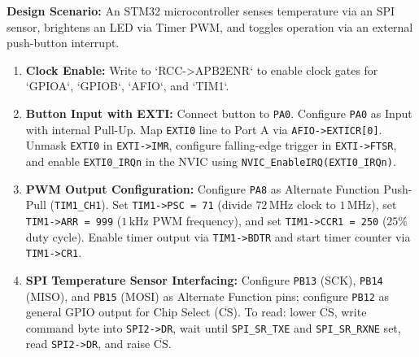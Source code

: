 \documentclass[12pt,a4paper]{article}
\begin{document}
\begin{tcolorbox}[examplebox, title={Worked Interface Design: ARM Push-Button, PWM LED and SPI Sensor}]
\textbf{Design Scenario:} An STM32 microcontroller senses temperature via an SPI sensor, brightens an LED via Timer PWM, and toggles operation via an external push-button interrupt.
\par\vspace{4pt}
\begin{enumerate}[leftmargin=*]
  \item \textbf{Clock Enable:} Write to `RCC->APB2ENR` to enable clock gates for `GPIOA`, `GPIOB`, `AFIO`, and `TIM1`.
  \item \textbf{Button Input with EXTI:} Connect button to \texttt{PA0}. Configure \texttt{PA0} as Input with internal Pull-Up. Map \texttt{EXTI0} line to Port A via \texttt{AFIO->EXTICR[0]}. Unmask \texttt{EXTI0} in \texttt{EXTI->IMR}, configure falling-edge trigger in \texttt{EXTI->FTSR}, and enable \texttt{EXTI0\_IRQn} in the NVIC using \texttt{NVIC\_EnableIRQ(EXTI0\_IRQn)}.
  \item \textbf{PWM Output Configuration:} Configure \texttt{PA8} as Alternate Function Push-Pull (\texttt{TIM1\_CH1}). Set \texttt{TIM1->PSC = 71} (divide $72\,\mathrm{MHz}$ clock to $1\,\mathrm{MHz}$), set \texttt{TIM1->ARR = 999} ($1\,\mathrm{kHz}$ PWM frequency), and set \texttt{TIM1->CCR1 = 250} ($25\%$ duty cycle). Enable timer output via \texttt{TIM1->BDTR} and start timer counter via \texttt{TIM1->CR1}.
  \item \textbf{SPI Temperature Sensor Interfacing:} Configure \texttt{PB13} (SCK), \texttt{PB14} (MISO), and \texttt{PB15} (MOSI) as Alternate Function pins; configure \texttt{PB12} as general GPIO output for Chip Select ($\overline{\mathrm{CS}}$). To read: lower $\overline{\mathrm{CS}}$, write command byte into \texttt{SPI2->DR}, wait until \texttt{SPI\_SR\_TXE} and \texttt{SPI\_SR\_RXNE} set, read \texttt{SPI2->DR}, and raise $\overline{\mathrm{CS}}$.
\end{enumerate}
\end{tcolorbox}
\end{document}
